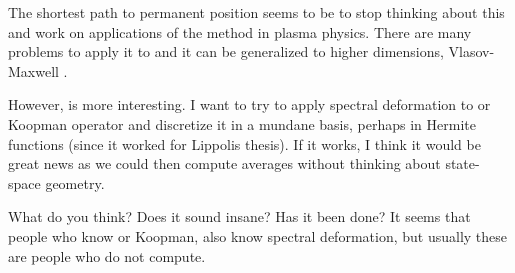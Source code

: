 \begin{description}
The shortest path to permanent position seems to be to stop thinking about this
and work on applications of the method in plasma physics.
There are many problems to apply it to and
it can be generalized to higher dimensions, Vlasov-Maxwell \etc.

However, {\FP} is more interesting.
I want to try to apply spectral deformation to {\FP} or
Koopman operator and discretize it in a mundane basis, perhaps in
Hermite functions (since it worked for Lippolis thesis).
If it works, I think it would be great news as we could then
compute averages without thinking about state-space geometry.

What do you think? Does it sound insane? Has it been done? It seems that
people who know {\FP} or Koopman, also know spectral deformation,
but usually these are people who do not compute.


\end{description}

